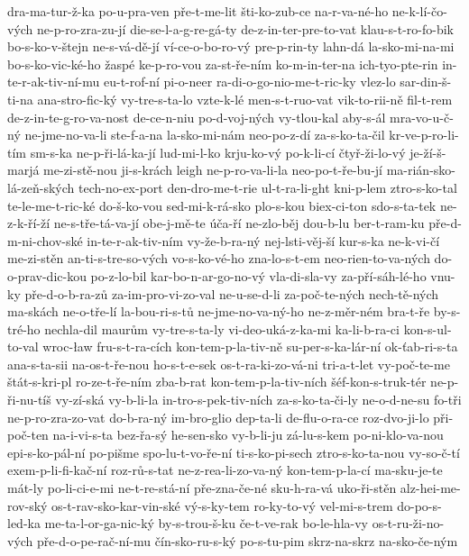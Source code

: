 dra-ma-tur-ž-ka
po-u-pra-ven
pře-t-me-lit
šti-ko-zub-ce
na-r-va-né-ho
ne-k-lí-čo-vých
ne-p-ro-zra-zu-jí
die-se-l-a-g-re-gá-ty
de-z-in-ter-pre-to-vat
klau-s-t-ro-fo-bik
bo-s-ko-v-štejn
ne-s-vá-dě-jí
ví-ce-o-bo-ro-vý
pre-p-rin-ty
lahn-dá
la-sko-mi-na-mi
bo-s-ko-vic-ké-ho
žaspé
ke-p-ro-vou
za-st-ře-ním
ko-m-in-ter-na
ich-tyo-pte-rin
in-te-r-ak-tiv-ní-mu
eu-t-rof-ní
pi-o-neer
ra-di-o-go-nio-me-t-ric-ky
vlez-lo
sar-din-š-ti-na
ana-stro-fic-ký
vy-tre-s-ta-lo
vzte-k-lé
men-s-t-ruo-vat
vik-to-rii-ně
fil-t-rem
de-z-in-te-g-ro-va-nost
de-ce-n-niu
po-d-voj-ných
vy-tlou-kal
aby-s-ál
mra-vo-u-č-ný
ne-jme-no-va-li
ste-f-a-na
la-sko-mi-nám
neo-po-z-dí
za-s-ko-ta-čil
kr-ve-p-ro-li-tím
sm-s-ka
ne-p-ři-lá-ka-jí
lud-mi-l-ko
krju-ko-vý
po-k-li-cí
čtyř-ži-lo-vý
je-ží-š-marjá
me-zi-stě-nou
ji-s-krách
leigh
ne-p-ro-va-li-la
neo-po-t-ře-bu-jí
ma-rián-sko-lá-zeň-ských
tech-no-ex-port
den-dro-me-t-rie
ul-t-ra-li-ght
kni-p-lem
ztro-s-ko-tal
te-le-me-t-ric-ké
do-š-ko-vou
sed-mi-k-rá-sko
plo-s-kou
biex-ci-ton
sdo-s-ta-tek
ne-z-k-ří-ží
ne-s-tře-tá-va-jí
obe-j-mě-te
úča-ří
ne-zlo-běj
dou-b-lu
ber-t-ram-ku
pře-d-m-ni-chov-ské
in-te-r-ak-tiv-ním
vy-že-b-ra-ný
nej-lsti-věj-ší
kur-s-ka
ne-k-vi-čí
me-zi-stěn
an-ti-s-tre-so-vých
vo-s-ko-vé-ho
zna-lo-s-t-em
neo-rien-to-va-ných
do-o-prav-dic-kou
po-z-lo-bil
kar-bo-n-ar-go-no-vý
vla-di-sla-vy
za-pří-sáh-lé-ho
vnu-ky
pře-d-o-b-ra-zů
za-im-pro-vi-zo-val
ne-u-se-d-li
za-poč-te-ných
nech-tě-ných
ma-skách
ne-o-tře-lí
la-bou-ri-s-tů
ne-jme-no-va-ný-ho
ne-z-měr-ném
bra-t-ře
by-s-tré-ho
nechla-dil
maurům
vy-tre-s-ta-ly
vi-deo-uká-z-ka-mi
ka-li-b-ra-ci
kon-s-ul-to-val
wroc-ław
fru-s-t-ra-cích
kon-tem-p-la-tiv-ně
su-per-s-ka-lár-ní
ok-ťab-ri-s-ta
ana-s-ta-sii
na-os-t-ře-nou
ho-s-t-e-sek
os-t-ra-ki-zo-vá-ni
tri-a-t-let
vy-poč-te-me
štát-s-kri-pl
ro-ze-t-ře-ním
zba-b-rat
kon-tem-p-la-tiv-ních
šéf-kon-s-truk-tér
ne-p-ři-nu-tíš
vy-zí-ská
vy-b-li-la
in-tro-s-pek-tiv-ních
za-s-ko-ta-či-ly
ne-o-d-ne-su
fo-tři
ne-p-ro-zra-zo-vat
do-b-ra-ný
im-bro-glio
dep-ta-li
de-flu-o-ra-ce
roz-dvo-ji-lo
při-poč-ten
na-i-vi-s-ta
bez-řa-sý
he-sen-sko
vy-b-li-ju
zá-lu-s-kem
po-ni-klo-va-nou
epi-s-ko-pál-ní
po-pišme
spo-lu-t-vo-ře-ní
ti-s-ko-pi-sech
ztro-s-ko-ta-nou
vy-so-č-tí
exem-p-li-fi-kač-ní
roz-rů-s-tat
ne-z-rea-li-zo-va-ný
kon-tem-p-la-cí
ma-sku-je-te
mát-ly
po-li-ci-e-mi
ne-t-re-stá-ní
pře-zna-če-né
sku-h-ra-vá
uko-ři-stěn
alz-hei-me-rov-ský
os-t-rav-sko-kar-vin-ské
vý-s-ky-tem
ro-ky-to-vý
vel-mi-s-trem
do-po-s-led-ka
me-ta-l-or-ga-nic-ký
by-s-trou-š-ku
če-t-ve-rak
bo-le-hla-vy
os-t-ru-ži-no-vých
pře-d-o-pe-rač-ní-mu
čín-sko-ru-s-ký
po-s-tu-pim
skrz-na-skrz
na-sko-če-ným
